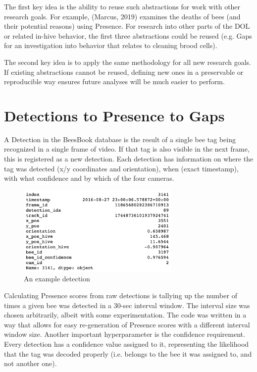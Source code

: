 The first key idea is the ability to reuse such abstractions for work with
other research goals. For example, (Marcus, 2019) examines the deaths of bees %
(and their potential reasons) using Presence. 
For research into other parts of the DOL or related in-hive
behavior, the first three abstractions could be reused (e.g. Gaps
for an investigation into behavior that relates to cleaning brood cells). 

The second key idea is to apply the same methodology for all new research goals.
If existing abstractions cannot be reused, defining new ones in a preservable or 
reproducible way ensures future analyses will be much easier to perform.  



\section{Detections to Presence to Gaps}

A Detection in the BeesBook database is the result of a single bee tag being
recognized in a single frame of video. If that tag is also visible in the next
frame, this is registered as a new detection. Each detection has information on
where the tag was detected (x/y coordinates and orientation), when (exact
timestamp), with what confidence and by which of the four cameras. 

\begin{figure}[htbp!] 
\centering    
\includegraphics[width=0.7\textwidth]{single-detection}
\caption[single-detection]{An example detection}
\label{fig:single-detection}
\end{figure}

Calculating Presence scores from raw detections is tallying up the number of
times a given bee was detected in a 30-sec interval window. The interval size
was chosen arbitrarily, albeit with some experimentation. The code was written
in a way that allows for easy re-generation of Presence scores with a different
interval window size. Another important hyperparameter is the confidence
requirement. Every detection has a confidence value assigned to it, representing
the likelihood that the tag was decoded properly (i.e. belongs to the bee it was
assigned to, and not another one).

